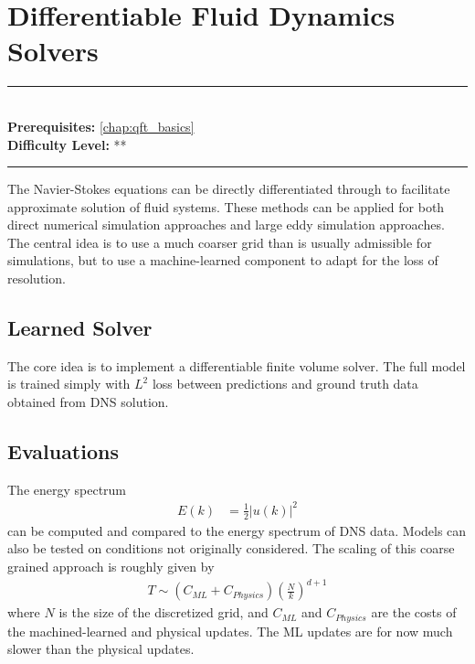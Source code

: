 \documentclass[book.tex]{subfiles}
\begin{document}
\chapter{Differentiable Fluid Dynamics Solvers}
\label{ch:fluids_modeling}

\label{chap:ml_coarse_fluid}
\noindent\rule{11cm}{0.4pt} \\
\textbf{Prerequisites:} \autoref{chap:qft_basics}  \\
\textbf{Difficulty Level:} ** \\
\noindent\rule{11cm}{0.4pt}
\vspace{5mm}

The Navier-Stokes equations can be directly differentiated through to facilitate approximate solution of fluid systems. These methods can be applied for both direct numerical simulation approaches and large eddy simulation approaches. The central idea is to use a much coarser grid than is usually admissible for simulations, but to use a machine-learned component to adapt for the loss of resolution\cite{kochkov2021machine}.

\section{Learned Solver}
The core idea is to implement a differentiable finite volume solver. The full model is trained simply with $L^2$ loss between predictions and ground truth data obtained from DNS solution. 

\section{Evaluations}

The energy spectrum
\begin{align}
E(k) &= \frac{1}{2}|u(k)|^2
\end{align}
can be computed and compared to the energy spectrum of DNS data. Models can also be tested on conditions not originally considered. The scaling of this coarse grained approach is roughly given by
\begin{align}
T \sim (C_{ML} + C_{Physics})\left ( \frac{N}{k} \right )^{d+1}
\end{align}
where $N$ is the size of the discretized grid, and $C_{ML}$ and $C_{Physics}$ are the costs of the machined-learned and physical updates. The ML updates are for now much slower than the physical updates.
\end{document}
